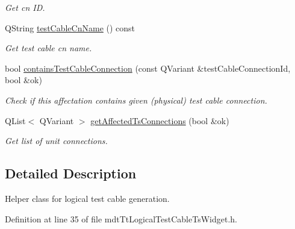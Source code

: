 \begin{DoxyCompactItemize}
\begin{DoxyCompactList}\small\item\em Get cn I\-D. \end{DoxyCompactList}\item 
Q\-String \hyperlink{classmdt_tt_logical_test_cable_ts_widget_a932ede3519c782d451a96a52a08e7e62}{test\-Cable\-Cn\-Name} () const 
\begin{DoxyCompactList}\small\item\em Get test cable cn name. \end{DoxyCompactList}\item 
bool \hyperlink{classmdt_tt_logical_test_cable_ts_widget_a3b657997aa7b77f1eee6a4ba0512b4f3}{contains\-Test\-Cable\-Connection} (const Q\-Variant \&test\-Cable\-Connection\-Id, bool \&ok)
\begin{DoxyCompactList}\small\item\em Check if this affectation contains given (physical) test cable connection. \end{DoxyCompactList}\item 
Q\-List$<$ Q\-Variant $>$ \hyperlink{classmdt_tt_logical_test_cable_ts_widget_a0e82731b771703308a399766da02b57a}{get\-Affected\-Ts\-Connections} (bool \&ok)
\begin{DoxyCompactList}\small\item\em Get list of unit connections. \end{DoxyCompactList}\end{DoxyCompactItemize}


\subsection{Detailed Description}
Helper class for logical test cable generation. 

Definition at line 35 of file mdt\-Tt\-Logical\-Test\-Cable\-Ts\-Widget.\-h.



